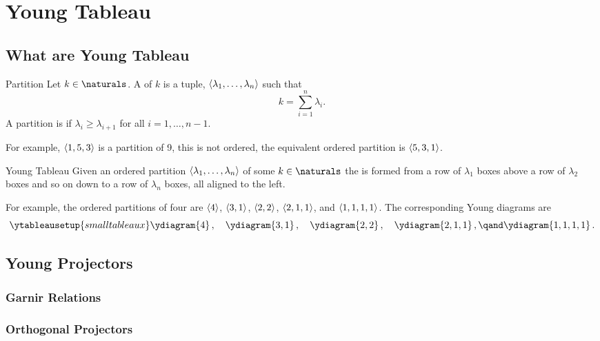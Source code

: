 \documentclass[fleqn]{NotesClass}
\DeclarePairedDelimiter{\tuple}{\langle}{\rangle}
\begin{document}
    \chapter{Young Tableau}
    \section{What are Young Tableau}
    \begin{dfn}{Partition}{}
        Let \(k \in \naturals\).
        A  of \(k\) is a tuple, \(\tuple{\lambda_1, \dotsc, \lambda_n}\) such that
        \begin{equation}
            k = \sum_{i = 1}^{n} \lambda_i.
        \end{equation}
        A partition is  if \(\lambda_i \ge \lambda_{i+1}\) for all \(i = 1, \dotsc, n - 1\).
    \end{dfn}
    For example, \(\tuple{1,5,3}\) is a partition of 9, this is not ordered, the equivalent ordered partition is \(\tuple{5,3,1}\).
    
    \begin{dfn}{Young Tableau}{}
        Given an ordered partition \(\tuple{\lambda_1, \dotsc, \lambda_n}\) of some \(k \in \naturals\) the  is formed from a row of \(\lambda_1\) boxes above a row of \(\lambda_2\) boxes and so on down to a row of \(\lambda_n\) boxes, all aligned to the left.
    \end{dfn}
    
    For example, the ordered partitions of four are \(\tuple{4}\), \(\tuple{3,1}\), \(\tuple{2,2}\), \(\tuple{2,1,1}\), and \(\tuple{1,1,1,1}\).
    The corresponding Young diagrams are
    \begin{equation}
        \ytableausetup{smalltableaux}
        \ydiagram{4}\,, \quad \ydiagram{3,1}\,, \quad \ydiagram{2,2}\,, \quad \ydiagram{2,1,1}\,, \qand \ydiagram{1,1,1,1}\,.
    \end{equation}
    
    \section{Young Projectors}
    \subsection{Garnir Relations}
    \subsection{Orthogonal Projectors}
    
    \backmatter
    \printindex
\end{document}
